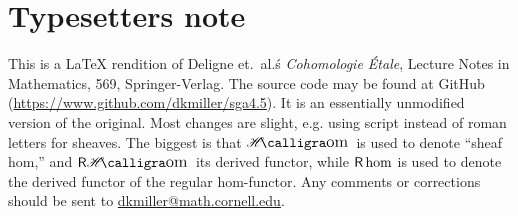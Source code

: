 
\section*{Typesetters note}

This is a \LaTeX{} rendition of Deligne et.\ al.\'s \emph{Cohomologie \'Etale}, Lecture 
Notes in Mathematics, 569, Springer-Verlag. The source code may be found at 
GitHub (\url{https://www.github.com/dkmiller/sga4.5}). It is an essentially 
unmodified version of the original. Most changes are slight, e.g. using 
script instead of roman letters for sheaves. The biggest is that 
$\Hom$ is used to denote ``sheaf hom,'' and $\rHom$ its derived functor, while 
$\operatorname{\mathsf{R}\hom}$ is used to denote the derived functor of the regular hom-functor. Any 
comments or corrections should be sent to \url{dkmiller@math.cornell.edu}.